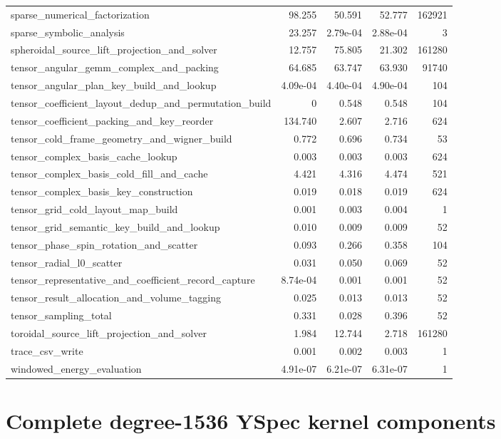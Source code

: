 \documentclass[11pt,a4paper]{article}
\begin{document}
\begin{longtable}{>{\raggedright\arraybackslash}p{10cm}rrrr}
sparse\_numerical\_factorization & 98.255 & 50.591 & 52.777 & 162921 \\
sparse\_symbolic\_analysis & 23.257 & 2.79e-04 & 2.88e-04 & 3 \\
spheroidal\_source\_lift\_projection\_and\_solver & 12.757 & 75.805 & 21.302 & 161280 \\
tensor\_angular\_gemm\_complex\_and\_packing & 64.685 & 63.747 & 63.930 & 91740 \\
tensor\_angular\_plan\_key\_build\_and\_lookup & 4.09e-04 & 4.40e-04 & 4.90e-04 & 104 \\
tensor\_coefficient\_layout\_dedup\_and\_permutation\_build & 0 & 0.548 & 0.548 & 104 \\
tensor\_coefficient\_packing\_and\_key\_reorder & 134.740 & 2.607 & 2.716 & 624 \\
tensor\_cold\_frame\_geometry\_and\_wigner\_build & 0.772 & 0.696 & 0.734 & 53 \\
tensor\_complex\_basis\_cache\_lookup & 0.003 & 0.003 & 0.003 & 624 \\
tensor\_complex\_basis\_cold\_fill\_and\_cache & 4.421 & 4.316 & 4.474 & 521 \\
tensor\_complex\_basis\_key\_construction & 0.019 & 0.018 & 0.019 & 624 \\
tensor\_grid\_cold\_layout\_map\_build & 0.001 & 0.003 & 0.004 & 1 \\
tensor\_grid\_semantic\_key\_build\_and\_lookup & 0.010 & 0.009 & 0.009 & 52 \\
tensor\_phase\_spin\_rotation\_and\_scatter & 0.093 & 0.266 & 0.358 & 104 \\
tensor\_radial\_l0\_scatter & 0.031 & 0.050 & 0.069 & 52 \\
tensor\_representative\_and\_coefficient\_record\_capture & 8.74e-04 & 0.001 & 0.001 & 52 \\
tensor\_result\_allocation\_and\_volume\_tagging & 0.025 & 0.013 & 0.013 & 52 \\
tensor\_sampling\_total & 0.331 & 0.028 & 0.396 & 52 \\
toroidal\_source\_lift\_projection\_and\_solver & 1.984 & 12.744 & 2.718 & 161280 \\
trace\_csv\_write & 0.001 & 0.002 & 0.003 & 1 \\
windowed\_energy\_evaluation & 4.91e-07 & 6.21e-07 & 6.31e-07 & 1 \\
\bottomrule\end{longtable}\endgroup
\clearpage\section{Complete degree-1536 YSpec kernel components}
\end{document}
